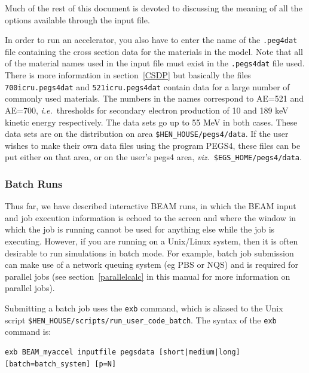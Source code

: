 \documentclass[12pt,twoside]{article}
\newcommand{\ie}{{\em i.e.}}
\newcommand{\viz}{{\em viz.}}
\begin{document}
Much of the rest of this document is devoted to discussing the meaning
of all the options available through the input file.

In order to run an accelerator, you also have to enter the name
of the {\tt .peg4dat} file containing the cross section data for the
materials in the model.  Note that all of the material names used
in the input file must exist in the {\tt .pegs4dat} file used.
There is more information in section~\ref{CSDP}
but basically
the files \verb+700icru.pegs4dat+ and \verb+521icru.pegs4dat+
contain data for a large number of
commonly used materials. The numbers in the names correspond to AE=521
and AE=700, \ie\ thresholds for secondary electron production of 10 and
189 keV kinetic energy respectively. The data sets go up to 55 MeV in
both cases.  These data sets are on the distribution on area
\verb+$HEN_HOUSE/pegs4/data+.  If the user wishes to make their own data
files using the program PEGS4,
these files can be put either on that area, or on the user's pegs4
area, \viz\ \verb+$EGS_HOME/pegs4/data+.

\subsubsection{Batch Runs}
\label{batchsect}

Thus far, we have described interactive BEAM runs, in which the BEAM
input and job execution information is echoed to the screen and where
the window in which the job is running cannot be used for anything else
while the job is executing.  However, if you are running on a Unix/Linux
system, then it is often desirable to run simulations in batch mode.
For example, batch
job submission can make use of a network queuing system
(eg PBS or NQS) and is required for parallel jobs
(see section~\ref{parallelcalc} in this manual for more information
on parallel jobs).

Submitting a batch job uses the {\tt exb} command, which is aliased
to the Unix script {\tt \$HEN\_HOUSE/scripts/run\_user\_code\_batch}.  The
syntax of the {\tt exb} command is:
\begin{verbatim}
exb BEAM_myaccel inputfile pegsdata [short|medium|long] [batch=batch_system] [p=N]
\end{verbatim}
\end{document}
